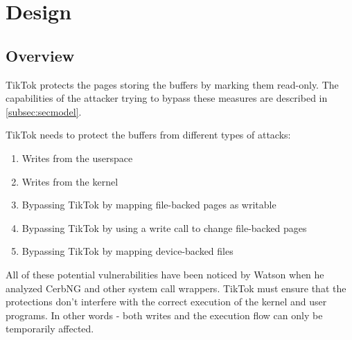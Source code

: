 \section{Design}
\label{sec:design}

\subsection{Overview}
\label{subsec:designoverview}
TikTok protects the pages storing the buffers by marking them
read-only. The capabilities of the attacker trying to bypass these measures
are described in \cref{subsec:secmodel}.

TikTok needs to protect the buffers from different types of attacks:

\begin{enumerate}
  \item \label{first} Writes from the userspace
  \item \label{second} Writes from the kernel
  \item \label{third} Bypassing TikTok by mapping file-backed pages as writable
  \item \label{fourth} Bypassing TikTok by using a write call to change file-backed pages
  \item \label{fifth} Bypassing TikTok by mapping device-backed files
\end{enumerate}

All of these potential vulnerabilities have been noticed by Watson when he
analyzed CerbNG\cite{watson2007exploiting} and other system call wrappers.
TikTok must ensure that the protections don't interfere with the correct
execution of the kernel and user programs. In other words - both writes and the
execution flow can only be temporarily affected.

